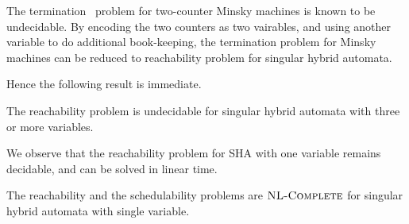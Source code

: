  The termination~\cite{Min67} problem for two-counter Minsky machines is known to be undecidable.
 By encoding the two counters as two vairables, and using another variable to
 do additional book-keeping, the termination problem for Minsky machines can be reduced
 to reachability problem for singular hybrid automata. 
 
 Hence the following result is immediate.
 \begin{theorem}
   \label{thm:SHA-undec-reach}
   The reachability problem is undecidable for singular hybrid automata with three or more variables. 
 \end{theorem}
 
We observe that the reachability problem for SHA with one variable remains decidable,
and can be solved in linear time. 
\begin{theorem}
  \label{thm:dec-SHA-one-var}
  The reachability and the schedulability problems are $\textsc{NL-Complete}$ for singular
  hybrid automata with single variable. 
\end{theorem}